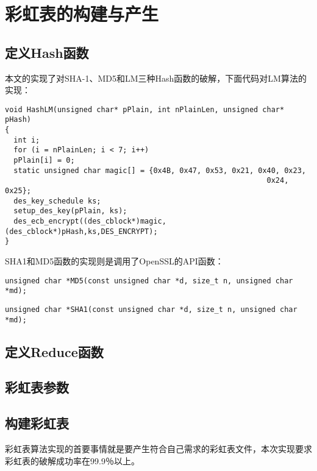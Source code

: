 \section{彩虹表的构建与产生}
\subsection{定义Hash函数}
本文的实现了对SHA-1、MD5和LM三种Hash函数的破解，下面代码对LM算法的实现：
\begin{lstlisting}
void HashLM(unsigned char* pPlain, int nPlainLen, unsigned char* pHash)
{   
  int i; 
  for (i = nPlainLen; i < 7; i++)
  pPlain[i] = 0;
  static unsigned char magic[] = {0x4B, 0x47, 0x53, 0x21, 0x40, 0x23, 
                                                            0x24, 0x25};
  des_key_schedule ks;
  setup_des_key(pPlain, ks);
  des_ecb_encrypt((des_cblock*)magic,(des_cblock*)pHash,ks,DES_ENCRYPT);
}
\end{lstlisting}
SHA1和MD5函数的实现则是调用了OpenSSL的API函数：
\begin{lstlisting}
unsigned char *MD5(const unsigned char *d, size_t n, unsigned char *md);
\end{lstlisting}
\begin{lstlisting}
unsigned char *SHA1(const unsigned char *d, size_t n, unsigned char *md);
\end{lstlisting}
\subsection{定义Reduce函数}
\subsection{彩虹表参数}
\subsection{构建彩虹表}
彩虹表算法实现的首要事情就是要产生符合自己需求的彩虹表文件，本次实现要求彩虹表的破解成功率在99.9％以上。

